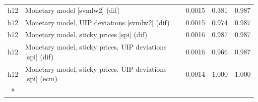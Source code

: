 \begin{ThreePartTable}
\begin{longtable}[t]{cp{5.5cm}ccc}
h12 & \raggedright Monetary model [svmlw2] (dif) & 0.0015 & 0.381 & 0.987\\
h12 & \raggedright Monetary model, UIP deviations [svmlw2] (dif) & 0.0015 & 0.974 & 0.987\\
h12 & \raggedright Monetary model, sticky prices [spi] (dif) & 0.0016 & 0.987 & 0.987\\
h12 & \raggedright Monetary model, sticky prices, UIP deviations [spi] (dif) & 0.0016 & 0.966 & 0.987\\
h12 & \raggedright Monetary model, sticky prices, UIP deviations [spi] (ecm) & 0.0014 & 1.000 & 1.000\\*
\end{longtable}
\end{ThreePartTable}
\endgroup{}
